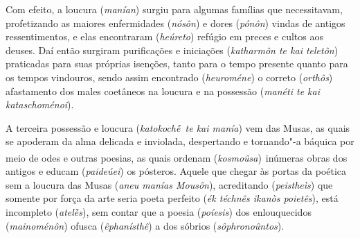 Com efeito, a loucura (\emph{manían}) surgiu para algumas famílias que
necessitavam, profetizando as maiores enfermidades (\emph{nósôn}) e
dores (\emph{pónôn}) vindas de antigos ressentimentos, e elas
encontraram (\emph{heúreto}) refúgio em preces e cultos aos deuses.
\bekker{[244e]} Daí então surgiram purificações e iniciações (\emph{katharmôn
te kai teletôn}) praticadas para suas próprias isenções, tanto para o
tempo presente quanto para os tempos vindouros, sendo assim encontrado
(\emph{heuroméne}) o correto (\emph{orthôs}) afastamento dos males
coetâneos na loucura e na possessão (\emph{manéti te kai
kataschoménoi}).

\bekker{[245a]} A terceira possessão e loucura (\emph{katokochḗ~te kai
manía}) vem das Musas, as quais se apoderam da alma delicada e
inviolada, despertando e tornando"-a báquica por meio de odes e outras
poesias, as quais ordenam (\emph{kosmoûsa})\textsuperscript{~}inúmeras
obras dos antigos e educam (\emph{paideúei}) os pósteros. Aquele que
chegar às portas da poética sem a loucura das Musas (\emph{aneu manías
Mousôn}), acreditando (\emph{peistheìs}) que somente por força da arte
seria poeta perfeito (\emph{ék téchnês ikanòs poietês}), está incompleto
(\emph{atelḕs}), sem contar que a poesia (\emph{poíesis}) dos
enlouquecidos (\emph{mainoménôn}) ofusca (\emph{êphanísthê}) a dos
sóbrios (\emph{sôphronoûntos}).

